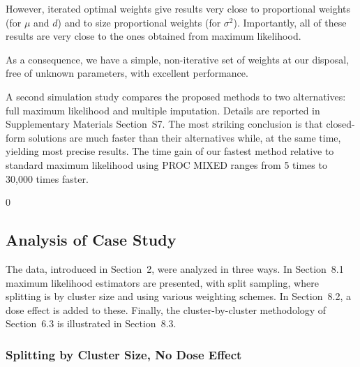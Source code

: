\documentclass[11pt,a5paper,twoside]{book}
\begin{document}
However, iterated optimal weights give results very close to proportional 
weights (for $\mu$ and $d$) and to size proportional weights (for $\sigma^2$). 
Importantly, all of these results are very close to the ones 
obtained from maximum likelihood.

As a consequence, we have a simple, non-iterative set of weights at our 
disposal, free of unknown parameters, with excellent performance.

A second simulation study compares the proposed methods to two alternatives: full maximum likelihood and multiple imputation. Details are reported in Supplementary Materials Section~S7.
The most striking conclusion is that closed-form solutions are  much faster than their alternatives while, at the same time, yielding most precise results.
The time gain of our fastest method relative to standard maximum likelihood using PROC MIXED ranges from 5 times to 30,000 times faster.

{0} %
\subsection{Analysis of Case Study}
\label{dataanal}

The data, introduced in Section~2,
were analyzed in three ways. 
In Section~8.1
maximum likelihood estimators are presented, with split sampling, where splitting is by cluster size and using various weighting schemes. In Section~8.2,
a dose effect is added to these. Finally, the cluster-by-cluster methodology of Section~6.3
is illustrated in Section~8.3.

\subsubsection{Splitting by Cluster Size, No Dose Effect}
\label{basic}
\end{document}
